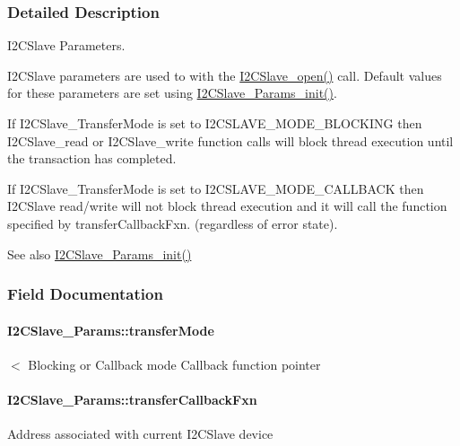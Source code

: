 \subsubsection{Detailed Description}
I2\+C\+Slave Parameters. 

I2\+C\+Slave parameters are used to with the \hyperlink{_i2_c_slave_8h_abdfc770ace6accbf91b91f3e195e7119}{I2\+C\+Slave\+\_\+open()} call. Default values for these parameters are set using \hyperlink{_i2_c_slave_8h_a3c29bf7436be17348ea73fabb6ede3ae}{I2\+C\+Slave\+\_\+\+Params\+\_\+init()}.

If I2\+C\+Slave\+\_\+\+Transfer\+Mode is set to I2\+C\+S\+L\+A\+V\+E\+\_\+\+M\+O\+D\+E\+\_\+\+B\+L\+O\+C\+K\+I\+N\+G then I2\+C\+Slave\+\_\+read or I2\+C\+Slave\+\_\+write function calls will block thread execution until the transaction has completed.

If I2\+C\+Slave\+\_\+\+Transfer\+Mode is set to I2\+C\+S\+L\+A\+V\+E\+\_\+\+M\+O\+D\+E\+\_\+\+C\+A\+L\+L\+B\+A\+C\+K then I2\+C\+Slave read/write will not block thread execution and it will call the function specified by transfer\+Callback\+Fxn. (regardless of error state).

\begin{DoxySeeAlso}{See also}
\hyperlink{_i2_c_slave_8h_a3c29bf7436be17348ea73fabb6ede3ae}{I2\+C\+Slave\+\_\+\+Params\+\_\+init()} 
\end{DoxySeeAlso}


\subsubsection{Field Documentation}
\paragraph[{transfer\+Mode}]{ I2\+C\+Slave\+\_\+\+Params\+::transfer\+Mode}\label{struct_i2_c_slave___params_a51c76c5694cd3a9e9102b9273cfe4a7f}
$<$ Blocking or Callback mode Callback function pointer 
\paragraph[{transfer\+Callback\+Fxn}]{ I2\+C\+Slave\+\_\+\+Params\+::transfer\+Callback\+Fxn}\label{struct_i2_c_slave___params_afed4d41de559f2ba40d23c0b597db7b8}
Address associated with current I2\+C\+Slave device 
